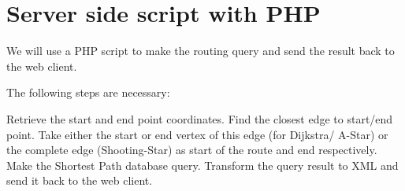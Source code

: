 \documentclass[a4paper,10pt,english]{manual}
\begin{document}
\resetcurrentobjects
\hypertarget{--doc-chapters/php_server}{}

\chapter{Server side script with PHP}

We will use a PHP script to make the routing query and send the result back to the web client.

The following steps are necessary:

Retrieve the start and end point coordinates.
Find the closest edge to start/end point.
Take either the start or end vertex of this edge (for Dijkstra/ A-Star) or the complete edge (Shooting-Star) as start of the route and end respectively.
Make the Shortest Path database query.
Transform the query result to XML and send it back to the web client.
\end{document}
